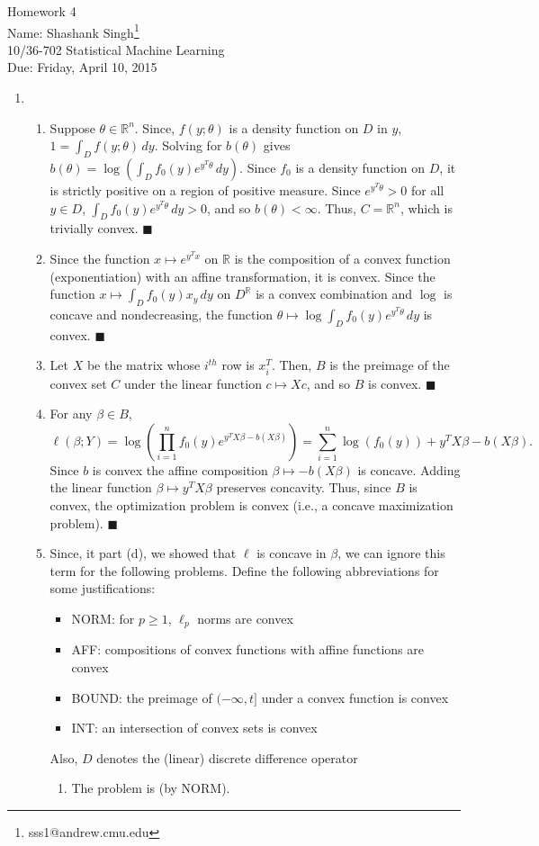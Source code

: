 \documentclass[11pt]{article}
\makeatletter
\newcommand{\myname}{Shashank Singh\footnote{sss1@andrew.cmu.edu}}
\newcommand{\myclass}{10/36-702 Statistical Machine Learning}
\newcommand{\myhwnum}{4}
\newcommand{\duedate}{Friday, April 10, 2015}
\renewcommand{\qed}{\quad \ensuremath{\blacksquare}}
\newcommand{\R}{\mathbb{R}} %
\makeatother
\begin{document}
{\Large Homework \myhwnum} \\
Name: \myname \\
\myclass \\
Due: \duedate

\begin{enumerate}
\item
\begin{enumerate}
\item Suppose $\theta \in \R^n$. Since, $f(y; \theta)$ is a density function on
$D$ in $y$, $1 = \int_D f(y; \theta) \, dy$. Solving for $b(\theta)$ gives
$b(\theta) = \log \left( \int_D f_0(y) e^{y^T \theta} \, dy \right)$. Since
$f_0$ is a density function on $D$, it is strictly positive on a region of
positive measure. Since $e^{y^T \theta} > 0$ for all $y \in D$,
$\int_D f_0(y) e^{y^T \theta} \, dy > 0$, and so $b(\theta) < \infty$. Thus, $C
= \R^n$, which is trivially convex. \qed

\item Since the function $x \mapsto e^{y^T x}$ on $\R$ is the composition of a
convex function (exponentiation) with an affine transformation, it is convex.
Since the function $x \mapsto \int_D f_0(y) x_y \, dy$ on $D^\R$ is a convex
combination and $\log$ is concave and nondecreasing, the function
$\theta \mapsto \log \int_D f_0(y) e^{y^T \theta} \, dy$ is convex. \qed

\item Let $X$ be the matrix whose $i^{th}$ row is $x_i^T$. Then, $B$ is the
preimage of the convex set $C$ under the linear function $c \mapsto Xc$, and
so $B$ is convex. \qed

\item For any $\beta \in B$,
\[\ell(\beta; Y)
    = \log \left( \prod_{i = 1}^n f_0(y)e^{y^T X\beta - b(X\beta)} \right)
    = \sum_{i = 1}^n \log \left( f_0(y) \right) + y^T X\beta - b(X\beta).
\]
Since $b$ is convex the affine composition $\beta \mapsto -b(X\beta)$ is
concave. Adding the linear function $\beta \mapsto y^T X\beta$ preserves
concavity. Thus, since $B$ is convex, the optimization problem is convex (i.e.,
a concave maximization problem). \qed

\item Since, it part (d), we showed that $\ell$ is concave in $\beta$, we can
ignore this term for the following problems. Define the following abbreviations
for some justifications:
\begin{itemize}
\item NORM: for $p \geq 1$, $\ell_p$ norms are convex
\item AFF: compositions of convex functions with affine functions are convex
\item BOUND: the preimage of $(-\infty,t]$ under a convex function is convex
\item INT: an intersection of convex sets is convex
\end{itemize}
Also, $D$ denotes the (linear) discrete difference operator
\begin{enumerate}
\item The problem is  (by NORM).


\end{enumerate}
\end{enumerate}
\end{enumerate}
\end{document}
